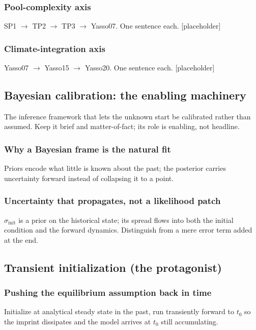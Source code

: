 \documentclass[11pt]{article}
\begin{document}
\subsubsection{Pool-complexity axis}
SP1 $\to$ TP2 $\to$ TP3 $\to$ Yasso07. One sentence each. [placeholder]

\subsubsection{Climate-integration axis}
Yasso07 $\to$ Yasso15 $\to$ Yasso20. One sentence each. [placeholder]

\subsection{Bayesian calibration: the enabling machinery}
The inference framework that lets the unknown start be calibrated rather than
assumed. Keep it brief and matter-of-fact; its role is enabling, not headline.

\subsubsection{Why a Bayesian frame is the natural fit}
Priors encode what little is known about the past; the posterior carries
uncertainty forward instead of collapsing it to a point.

\subsubsection{Uncertainty that propagates, not a likelihood patch}
$\sigma_{\mathrm{init}}$ is a prior on the historical state; its spread flows
into both the initial condition and the forward dynamics. Distinguish from a
mere error term added at the end.

\subsection{Transient initialization (the protagonist)}

\subsubsection{Pushing the equilibrium assumption back in time}
Initialize at analytical steady state in the past, run transiently forward to
$t_0$ so the imprint dissipates and the model arrives at $t_0$ still
accumulating.
\end{document}
